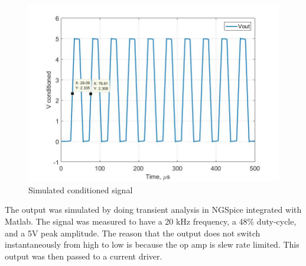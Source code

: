 \begin{figure}[H]
	\centering
	\includegraphics[width=0.6\linewidth]{CircuitDevelopment/Vconditioned_sim}
	\caption[Simulated conditioned signal]{Simulated conditioned signal}
	\label{fig:vconditionedsim}
\end{figure}

The output was simulated by doing transient analysis in NGSpice integrated with Matlab. The signal was measured to have a 20 kHz frequency, a 48\% duty-cycle, and a 5V peak amplitude. The reason that the output does not switch instantaneously from high to low is because the op amp is slew rate limited. This output was then passed to a current driver.


